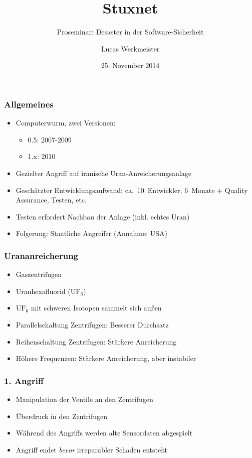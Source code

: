 \documentclass{beamer}
\title{Stuxnet}
\subtitle{Proseminar: Desaster in der Software-Sicherheit}
\author{Lucas Werkmeister}
\date{25. November 2014}
\begin{document}
\newcommand{\ufsechs}[0]{$\mathrm{UF_6}$\xspace}

\begin{frame}
  \titlepage
\end{frame}

\begin{frame}
  \frametitle{Allgemeines}
  \begin{itemize}
    \item Computerwurm, zwei Versionen:
      \begin{itemize}
        \item 0.5: 2007-2009
        \item 1.x: 2010
      \end{itemize}
    \item Gezielter Angriff auf iranische Uran-Anreicherungsanlage
    \item Geschätzter Entwicklungsaufwand: ca.~10~Entwickler, 6~Monate + Quality Assurance, Testen, etc.
    \item Testen erfordert Nachbau der Anlage (inkl. echtes Uran)
    \item Folgerung: Staatliche Angreifer (Annahme: USA)
  \end{itemize}
\end{frame}

\begin{frame}
  \frametitle{Urananreicherung}
  \begin{itemize}
    \item Gaszentrifugen
    \item Uranhexafluorid (\ufsechs)
    \item \ufsechs mit schweren Isotopen sammelt sich außen
    \item Parallelschaltung Zentrifugen: Besserer Durchsatz
    \item Reihenschaltung Zentrifugen: Stärkere Anreicherung
    \item Höhere Frequenzen: Stärkere Anreicherung, aber instabiler
  \end{itemize}
\end{frame}

\begin{frame}
  \frametitle{1. Angriff}
  \begin{itemize}
    \item Manipulation der Ventile an den Zentrifugen
    \item Überdruck in den Zentrifugen
    \item Während des Angriffs werden alte Sensordaten abgespielt
    \item Angriff endet \emph{bevor} irreparabler Schaden entsteht
  \end{itemize}
\end{frame}
\end{document}
